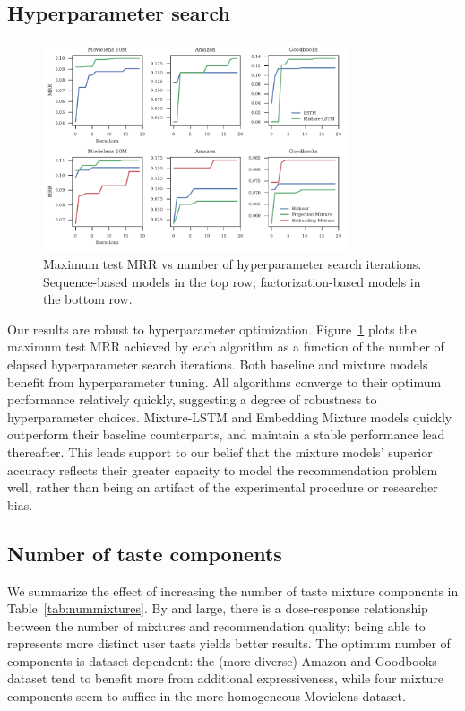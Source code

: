 \documentclass[sigchi]{acmart}
\begin{document}
\subsection{Hyperparameter search}
\begin{figure}[h]
  \captionsetup{width=.8\linewidth}
  \caption{Maximum test MRR vs number of hyperparameter search iterations. Sequence-based models in the top row; factorization-based models in the bottom row.}
  \label{fig:hyper}
  \includegraphics[width=0.8\textwidth]{includes/hyperparam_search.pdf}
\end{figure}
Our results are robust to hyperparameter optimization. Figure~\ref{fig:hyper} plots the maximum test MRR achieved by each algorithm as a function of the number of elapsed hyperparameter search iterations. Both baseline and mixture models benefit from hyperparameter tuning. All algorithms converge to their optimum performance relatively quickly, suggesting a degree of robustness to hyperparameter choices. Mixture-LSTM and Embedding Mixture models quickly outperform their baseline counterparts, and maintain a stable performance lead thereafter. This lends support to our belief that the mixture models' superior accuracy reflects their greater capacity to model the recommendation problem well, rather than being an artifact of the experimental procedure or researcher bias.

\subsection{Number of taste components}

We summarize the effect of increasing the number of taste mixture components in Table~\ref{tab:nummixtures}. By and large, there is a dose-response relationship between the number of mixtures and recommendation quality: being able to represents more distinct user tasts yields better results. The optimum number of components is dataset dependent: the (more diverse) Amazon and Goodbooks dataset tend to benefit more from additional expressiveness, while four mixture components seem to suffice in the more homogeneous Movielens dataset.
\end{document}
